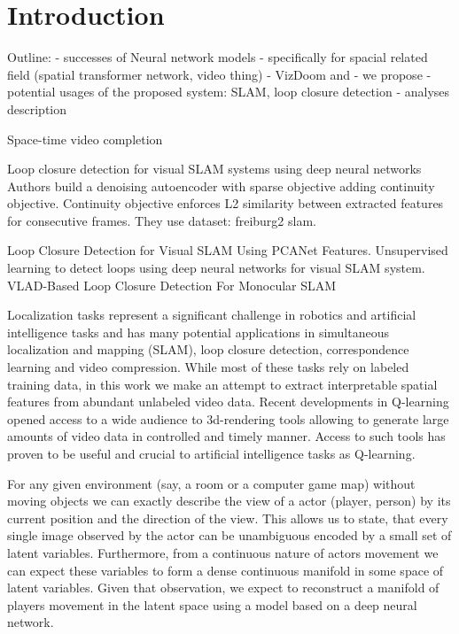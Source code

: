 
\chapter{Introduction}
\label{ch:intro}

Outline:
- successes of Neural network models
- specifically for spacial related field (spatial transformer network, video thing)
- VizDoom and
- we propose
- potential usages of the proposed system: SLAM, loop closure detection
- analyses description

Space-time video completion \cite{Wexler2004}

Loop closure detection for visual SLAM systems using deep neural networks \cite{Gao2015}
Authors build a denoising autoencoder with sparse objective adding continuity objective.
Continuity objective enforces L2 similarity between extracted features for consecutive frames. They use dataset: freiburg2 slam.

Loop Closure Detection for Visual SLAM Using PCANet Features.
Unsupervised learning to detect loops using deep neural networks for visual SLAM system.
VLAD-Based Loop Closure Detection For Monocular SLAM \cite{Xia2016, Gao2015a, Huang2016}

Localization tasks represent a significant challenge in robotics and artificial intelligence tasks \cite{localization, AI} and has many potential applications in simultaneous localization and mapping (SLAM), loop closure detection, correspondence learning and video compression.
While most of these tasks rely on labeled training data, in this work we make an attempt to extract interpretable spatial features from abundant unlabeled video data.
Recent developments in Q-learning opened access to a wide audience to 3d-rendering tools allowing to generate large amounts of video data in controlled and timely manner.
Access to such tools has proven to be useful and crucial to artificial intelligence tasks as Q-learning.

For any given environment (say, a room or a computer game map) without moving objects we can exactly describe the view of a actor (player, person) by its current position and the direction of the view.
This allows us to state, that every single image observed by the actor can be unambiguous encoded by a small set of latent variables.
Furthermore, from a continuous nature of actors movement we can expect these variables to form a dense continuous manifold in some space of latent variables.
Given that observation, we expect to reconstruct a manifold of players movement in the latent space using a model based on a deep neural network.

